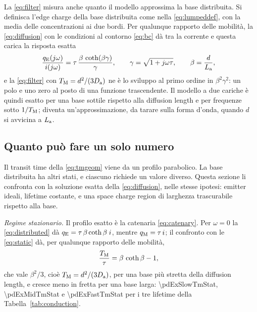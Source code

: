 \documentclass[10pt,a4paper]{scrartcl}
\let\newcommand\pdvaluedefine
\newcommand{\TM}{T_\mathrm{M}}
\newcommand{\qE}{q_\mathrm{E}}
\newcommand{\qM}{q_\mathrm{M}}
\newcommand{\Da}{D_\mathrm{a}}
\newcommand{\La}{L_\mathrm{a}}
\begin{document}
La \eqref{eq:filter} misura anche quanto il modello approssima la base distribuita. Si definisca l'edge charge della base distribuita come nella \eqref{eq:lumpeddef}, con la media delle concentrazioni ai due bordi. Per qualunque rapporto delle mobilità, la \eqref{eq:diffusion} con le condizioni al contorno \eqref{eq:bc} dà tra la corrente e questa carica la risposta esatta
\begin{equation}
\frac{\qE(j\omega)}{i(j\omega)} = \tau\,\frac{\beta\,\coth(\beta\gamma)}{\gamma} , \qquad \gamma = \sqrt{1+j\omega\tau} , \qquad \beta = \frac{d}{\La} ,
\label{eq:distributed}
\end{equation}
e la \eqref{eq:filter} con $\TM = d^2/(3\Da)$ ne è lo sviluppo al primo ordine in $\beta^2\gamma^2$: un polo e uno zero al posto di una funzione trascendente. Il modello a due cariche è quindi esatto per una base sottile rispetto alla diffusion length e per frequenze sotto $1/\TM$; diventa un'approssimazione, da tarare sulla forma d'onda, quando $d$ si avvicina a $\La$.
\subsection{Quanto può fare un solo numero}
\label{sec:onenumber}
Il transit time della \eqref{eq:tmgeom} viene da un profilo parabolico. La base distribuita ha altri stati, e ciascuno richiede un valore diverso. Questa sezione li confronta con la soluzione esatta della \eqref{eq:diffusion}, nelle stesse ipotesi: emitter ideali, lifetime costante, e una space charge region di larghezza trascurabile rispetto alla base.

\emph{Regime stazionario.} Il profilo esatto è la catenaria \eqref{eq:catenary}. Per $\omega = 0$ la \eqref{eq:distributed} dà $\qE = \tau\,\beta\coth\beta\;i$, mentre $\qM = \tau\,i$; il confronto con le \eqref{eq:static} dà, per qualunque rapporto delle mobilità,
\begin{equation}
\frac{\TM}{\tau} = \beta\,\coth\beta - 1 ,
\label{eq:tmstatic}
\end{equation}
che vale $\beta^2/3$, cioè $\TM = d^2/(3\Da)$, per una base più stretta della diffusion length, e cresce meno in fretta per una base larga: \num{\pdExSlowTmStat}, \num{\pdExMidTmStat} e \num{\pdExFastTmStat} per i tre lifetime della Tabella~\ref{tab:conduction}.
\end{document}
